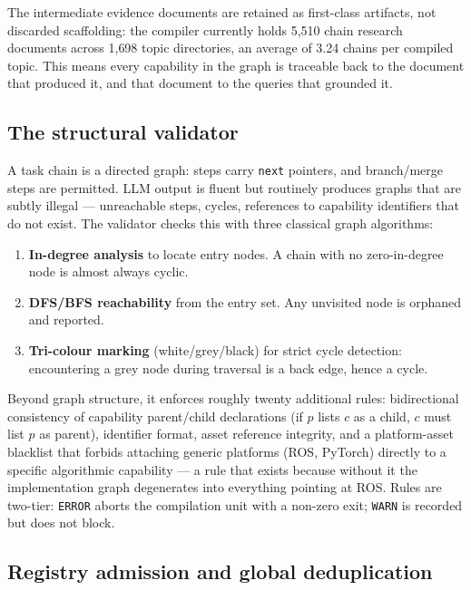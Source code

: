 \documentclass[10pt,a4paper]{article}
\begin{document}
The intermediate evidence documents are retained as first-class artifacts, not
discarded scaffolding: the compiler currently holds 5{,}510 chain research
documents across 1{,}698 topic directories, an average of 3.24 chains per
compiled topic. This means every capability in the graph is traceable back to the
document that produced it, and that document to the queries that grounded it.


\subsection{The structural validator}
\label{sec:g1}

A task chain is a directed graph: steps carry \texttt{next} pointers, and
branch/merge steps are permitted. LLM output is fluent but routinely produces
graphs that are subtly illegal --- unreachable steps, cycles, references to
capability identifiers that do not exist. The validator checks this with three classical
graph algorithms:

\begin{enumerate}[leftmargin=1.4em,itemsep=2pt]
\item \textbf{In-degree analysis} to locate entry nodes. A chain with no
  zero-in-degree node is almost always cyclic.
\item \textbf{DFS/BFS reachability} from the entry set. Any unvisited node is
  orphaned and reported.
\item \textbf{Tri-colour marking} (white/grey/black) for strict cycle detection:
  encountering a grey node during traversal is a back edge, hence a cycle.
\end{enumerate}

Beyond graph structure, it enforces roughly twenty additional rules: bidirectional
consistency of capability parent/child declarations (if $p$ lists $c$ as a child,
$c$ must list $p$ as parent), identifier format, asset reference integrity, and a
platform-asset blacklist that forbids attaching generic platforms (ROS, PyTorch)
directly to a specific algorithmic capability --- a rule that exists because
without it the implementation graph degenerates into everything pointing at ROS.
Rules are two-tier: \texttt{ERROR} aborts the compilation unit with a non-zero
exit; \texttt{WARN} is recorded but does not block.


\subsection{Registry admission and global deduplication}
\label{sec:g2}
\end{document}
